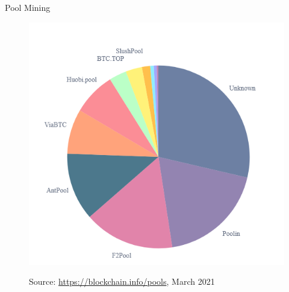 \documentclass[handout]{beamer}
\begin{document}
\begin{frame}{Pool Mining}
	\centering
	\begin{figure}[t]
		\includegraphics[height = 0.8\textheight]{../assets/images/mining_pools}
		
		Source: \link \url{https://blockchain.info/pools}, March 2021
	\end{figure}
\end{frame}

\end{document}

